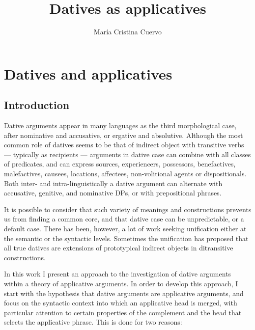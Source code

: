 \documentclass[output=paper,colorlinks,citecolor=brown,modfonts,nonflat]{langsci/langscibook}
\author{María Cristina Cuervo\affiliation{University of Toronto}}
\title{Datives as applicatives}
\begin{document}
\maketitle

\section{Datives and applicatives}\label{sec:cuervo:1}

\subsection{Introduction}\label{sec:cuervo:1.1}

Dative arguments appear in many languages as the third morphological case, after nominative and accusative, or ergative and absolutive. Although the most common role of datives seems to be that of indirect object with transitive verbs — typically as recipients — arguments in dative case can combine with all classes of predicates, and can express sources, experiencers, possessors, benefactives, malefactives, causees, locations, affectees, non-volitional agents or dispositionals. Both inter- and intra-linguistically a dative argument can alternate with accusative, genitive, and nominative DPs, or with prepositional phrases.

It is possible to consider that such variety of meanings and constructions prevents us from finding a common core, and that dative case can be unpredictable, or a default case.  There has been, however, a lot of work seeking unification either at the semantic or the syntactic levels. Sometimes the unification has proposed that all true datives are extensions of prototypical indirect objects in ditransitive constructions.

In this work I present an approach to the investigation of dative arguments within a theory of applicative arguments. In order to develop this approach, I start with the hypothesis that dative arguments are applicative arguments, and focus on the syntactic context into which an applicative head is merged, with particular attention to certain properties of the complement and the head that selects the applicative phrase. This is done for two reasons:
\end{document}
